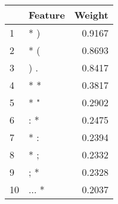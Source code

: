 \begin{tabular}{llr}
\toprule
{} & Feature &  Weight \\
\midrule
1  &     * ) &  0.9167 \\
2  &     * ( &  0.8693 \\
3  &     ) . &  0.8417 \\
4  &     * * &  0.3817 \\
5  &     * " &  0.2902 \\
6  &     : * &  0.2475 \\
7  &     * : &  0.2394 \\
8  &     * ; &  0.2332 \\
9  &     ; * &  0.2328 \\
10 &   ... * &  0.2037 \\
\bottomrule
\end{tabular}
